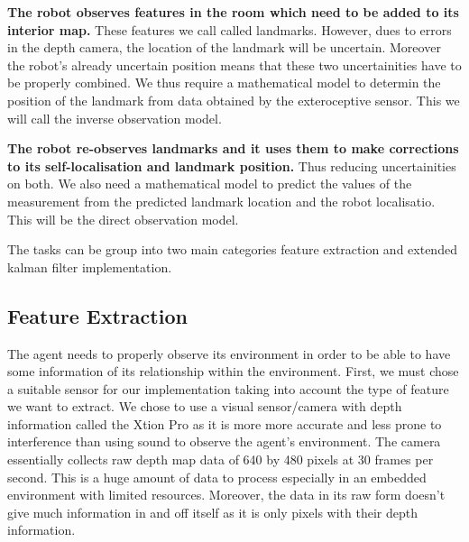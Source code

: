 \documentclass[]{article}
\begin{document}
{\textbf{The robot observes features in the room which need to be added to its interior map.} These features we call called landmarks. However, dues to errors in the depth camera, the location of the landmark will be uncertain. Moreover the robot's already uncertain position means that these two uncertainities have to be properly combined. We thus require a mathematical model to determin the position of the landmark from data obtained by the exteroceptive sensor. This we will call the inverse observation model.

\textbf{The robot re-observes landmarks and it uses them to  make corrections to its self-localisation and landmark position.} Thus reducing uncertainities on both. We also need a mathematical model to predict the values of the measurement from the predicted landmark location and the robot localisatio. This will be the direct observation model.

The tasks can be group into two main categories feature extraction and extended kalman filter implementation.

\subsection{Feature Extraction}
The agent needs to properly observe its environment in order to be able to have some information of its relationship within the environment. First, we must chose a suitable sensor for our implementation taking into account the type of feature we want to extract. We chose to use a visual sensor/camera with depth information called the Xtion Pro as it is more more accurate and less prone to interference than using sound to observe the agent's environment. The camera essentially collects raw depth map data of 640 by 480 pixels at 30 frames per second. This is a huge amount of data to process especially in an embedded environment with limited resources. Moreover, the data in its raw form doesn't give much information in and off itself as it is only pixels with their depth information.

}
\end{document}
